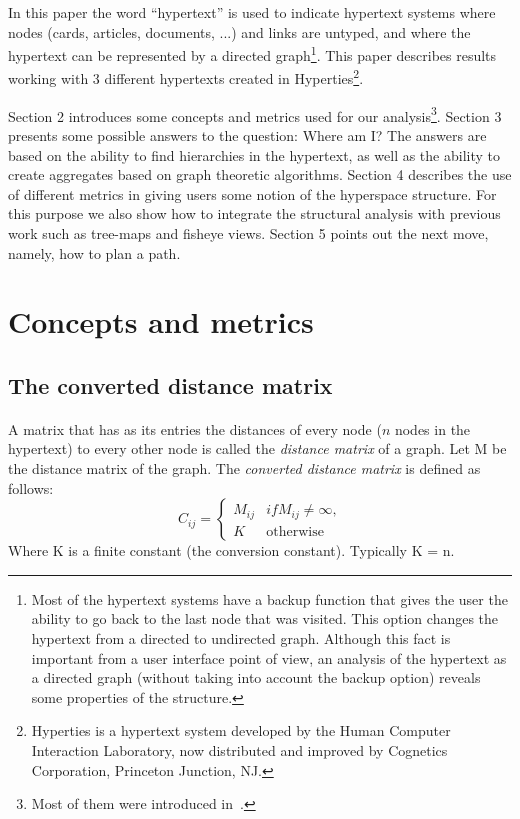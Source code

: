 \documentclass[twocolumn,10pt]{article}
\begin{document}
In this paper the word ``hypertext'' is used to indicate 
hypertext systems where nodes (cards, articles, documents, ...)
and links are untyped, and where the hypertext
can be represented by a directed graph\footnote{Most of the hypertext systems have a backup function that
gives the user the ability to go back to the last node that was visited.
This option changes the hypertext from a directed to undirected graph.
Although this fact is important from a user interface point of view, 
an analysis of the hypertext as a directed graph
(without taking into account the backup option) reveals some properties
of the structure.}.
This paper describes results working with 3 different hypertexts
created in Hyperties\footnote{Hyperties is a hypertext system developed by the Human 
Computer Interaction Laboratory, now distributed and improved by 
Cognetics Corporation, Princeton
Junction, NJ.}.

Section 2 introduces some concepts and metrics used for our
analysis\footnote{Most of them were introduced in~\cite{bot90}.}.
Section 3 presents some possible answers to the question: Where am
I? The answers are based on the ability to find hierarchies in 
the hypertext, as well as the ability to create aggregates based
on graph theoretic algorithms. 
Section 4 describes the use of different metrics in giving 
users some notion of the hyperspace structure. For this
purpose we also show how to integrate the structural analysis
with previous work such as tree-maps and fisheye views.
Section 5 points out the next move, namely, how to plan a path.
 


\section{Concepts and metrics}
\subsection*{The converted distance matrix}
\paragraph{}
A matrix that has as its entries the distances of every node ($n$ nodes
in the hypertext) 
to every other
node is called the {\em distance matrix} of a graph. Let M be the distance
matrix of the graph.
The {\em converted distance matrix} is defined as follows:
\[ C_{ij} = \left\{ \begin{array}{ll}
                      M_{ij} & \mbox{$if M_{ij} \neq \infty$,}     \\
                      K      & \mbox{otherwise}
                    \end{array}
            \right.
\]
Where K is a finite constant (the conversion constant). Typically K = n.
\end{document}
